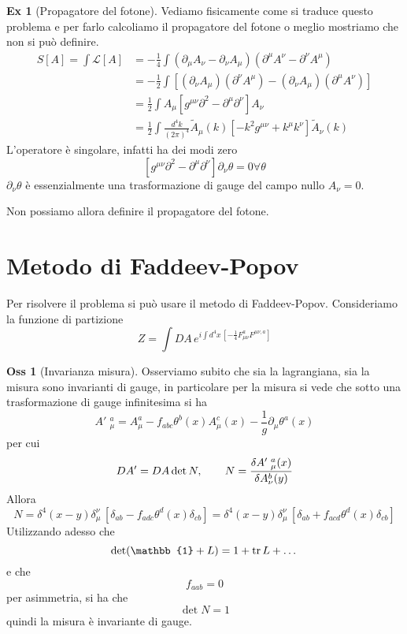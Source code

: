 \documentclass[10pt,a4paper]{article}
\theoremstyle{definition}
\newtheorem{observation}{Oss}[section]
\newtheorem{example}{Ex}[section]
\newcommand{\lagr}{\mathcal{L}} %
\newcommand{\id}{\mathbb{1}}
\begin{document}
\begin{example}[Propagatore del fotone]
    Vediamo fisicamente come si traduce questo problema e per farlo calcoliamo il propagatore del fotone o meglio mostriamo che non si può definire.
    \begin{align*}
    S[A] = \int \lagr[A] &= -\frac14 \int (\partial_\mu A_\nu - \partial_\nu A_\mu)(\partial^\mu A^\nu - \partial^\nu A^\mu)      \\
    &= -\frac12 \int [(\partial_\nu A_\mu)(\partial^\nu A^\mu) - (\partial_\nu A_\mu)(\partial^\mu A^\nu)]   \\
    &= \frac12 \int A_\mu [g^{\mu \nu} \partial^2 - \partial^\mu \partial^\nu]A_\nu \\
    &= \frac12 \int \frac{d^4 k}{(2\pi)^4} \tilde{A}_\mu(k)[-k^2 g^{\mu\nu} + k^\mu k^\nu]\tilde{A}_\nu(k)
    \end{align*}
    L'operatore è singolare, infatti ha dei modi zero
    \[
        [g^{\mu \nu} \partial^2 - \partial^\mu \partial^\nu] \partial_\nu \theta = 0 \forall \theta
    \]
    $\partial_\nu\theta$ è essenzialmente una trasformazione di gauge del campo nullo $A_\nu = 0$.

    Non possiamo allora definire il propagatore del fotone.
\end{example}

\section{Metodo di Faddeev-Popov}
    Per risolvere il problema si può usare il metodo di Faddeev-Popov. Consideriamo la funzione di partizione 
    \[
    Z = \int DA\,e^{i \int d^4x\, [-\frac14 F_{\mu\nu}^aF^{\mu\nu, a}]}    
    \]
\begin{observation}[Invarianza misura]
    Osserviamo subito che sia la lagrangiana, sia la misura sono invarianti di gauge, in particolare per la misura si vede che sotto una trasformazione di gauge infinitesima si ha
    \[
    A'\phantom{.}_\mu^a = A_\mu^a - f_{abc} \theta^b(x) A_\mu^c(x) - \frac{1}{g}\partial_\mu\theta^a(x)    
    \]
    per cui
    \[
    DA' = DA \det N , \qquad N = \fdv{A'\phantom{.}_\mu^a(x)}{A_\nu^b(y)}   
    \]
    Allora
    \[
    N = \delta^4(x - y) \delta_\mu^\nu\, [\delta_{ab} - f_{adc}\theta^d(x)\delta_{cb}] = \delta^4(x - y) \delta_\mu^\nu \, [\delta_{ab} + f_{acd}\theta^d(x)\delta_{cb}]    
    \]
    Utilizzando adesso che
    \[
    \det(\id + L) = 1 + \tr L + \dots    
    \]
    e che
    \[
    f_{aab} = 0    
    \]
    per asimmetria, si ha che
    \[
    \det N = 1    
    \]
    quindi la misura è invariante di gauge.
\end{observation}
\end{document}
